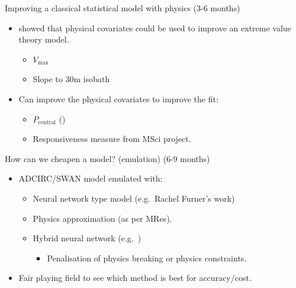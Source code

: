 \begin{frame}{Improving a classical statistical model
    with physics
    (3-6 months)}
    
    \vspace{100pt}

    \begin{itemize}
        \item \cite{Chavas2013U.S.Perspective} showed that physical covariates could be used to improve an extreme value theory model. 
        \begin{itemize}
            \item $V_{\mathrm{max}}$
            \item Slope to 30m isobath
        \end{itemize}
        
        \item Can improve the physical covariates to improve the fit:
        \begin{itemize}
            \item $P_{\mathrm{central}}$ (\cite{Chavas2017PhysicalRelationship})
            \item Responsiveness measure from MSci project.
        \end{itemize}
    \end{itemize}
\end{frame}

\begin{frame}{How can we cheapen a model? (emulation) (6-9 months)}

    \vspace{105pt}

\begin{itemize}
    \item ADCIRC/SWAN model emulated with:
    \begin{itemize}
        \item Neural network type model (e.g.~Rachel Furner's work)
        \item Physics approximation (as per MRes).
        \item Hybrid neural network (e.g.~\cite{beucler2019achieving})
        \begin{itemize}
            \item Penalisation of physics breaking or physics constraints.
        \end{itemize}
    \end{itemize}
    \item  Fair playing field to see which method is best for accuracy/cost.
\end{itemize}
\end{frame}

